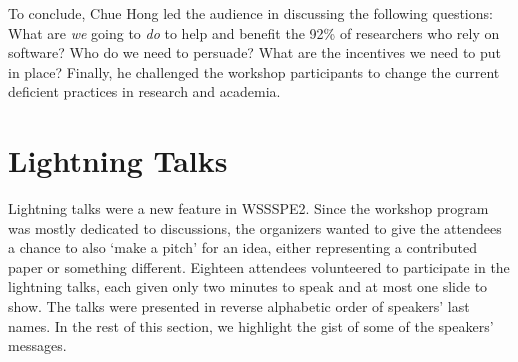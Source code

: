 \documentclass[11pt, oneside]{amsart}
\newcommand{\note}[1]{ {\textcolor{blueish}    { ***Note:      #1 }}}
\begin{document}
To conclude, Chue Hong led the audience in discussing the following questions:
What are \emph{we} going to \emph{do} to help and benefit the 92\% of researchers
who rely on software? Who do we need to persuade? What are the incentives we
need to put in place? Finally, he challenged the workshop participants to change
the current deficient practices in research and academia.


\section{Lightning Talks} \label{sec:lightning}
\begin{comment}
\note{Lead: Choi. Volunteers welcome.
\href{http://wssspe.researchcomputing.org.uk/wssspe2/lightning-talks/}{Slides.}}

Lighting talks, breakout groups, working groups are all different. Lightning
talks were new in WSSSPE2. They were offered to all paper contributors, and some
other attendees, those who got travel awards. Breakout groups in WSSSPE1 were
just discussions about topics; in WSSSPE2, the breakout groups were supposed to
come up with plans for actions in specific areas. The idea of working groups is
that they will come out of breakout groups as a way for the groups to actually
do the actions over time, not at the workshops.

Email addresses of speakers: gvwilson@software-carpentry.org, Colin Venters
<C.Venters@hud.ac.uk>, j.spencer@imperial.ac.uk, erinrobinson@esipfed.org,
marpierc@iu.edu, jwpeterson@gmail.com, abani@buffalo.edu, clenhardt@renci.org,
dsk@uchicago.edu, Samin.Ishtiaq@microsoft.com, james@howison.name,
s.a.harris@leeds.ac.uk, marcus.hanwell@kitware.com, thabermann@hdfgroup.org,
rdowns@ciesin.columbia.edu, cboettig@gmail.com, jakob.blomer@cern.ch,
editor@ascl.net
\end{comment}

Lightning talks were a new feature in WSSSPE2. Since the workshop program was
mostly dedicated to discussions, the organizers wanted to give the attendees a
chance to also `make a pitch' for an idea, either representing a contributed
paper or something different. Eighteen attendees volunteered to participate in
the lightning talks, each given only two minutes to speak and at most one slide
to show. The talks were presented in reverse alphabetic order of speakers' last
names. In the rest of this section, we highlight the gist of some of the
speakers' messages.
\end{document}
